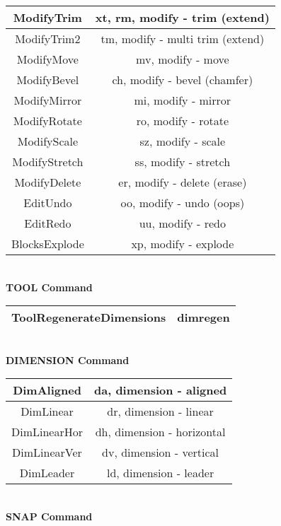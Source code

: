 \begin{table}[h!]\centering\begin{tabular}{|c|c|}
\hline ModifyTrim & xt, rm, modify - trim (extend)\\
\hline ModifyTrim2 & tm, modify - multi trim (extend)\\
\hline ModifyMove & mv, modify - move\\
\hline ModifyBevel & ch, modify - bevel (chamfer)\\
\hline ModifyMirror & mi, modify - mirror\\
\hline ModifyRotate & ro, modify - rotate\\
\hline ModifyScale & sz, modify - scale \\
\hline ModifyStretch & ss, modify - stretch\\
\hline ModifyDelete & er, modify - delete (erase)\\
\hline EditUndo & oo, modify - undo (oops)\\
\hline EditRedo & uu, modify - redo\\
\hline BlocksExplode & xp, modify - explode\\
\hline \end{tabular}\end{table} \vspace{.1in}
%
\textbf{\\TOOL Command}
\begin{table}[h!]\centering\begin{tabular}{|c|c|}
\hline ToolRegenerateDimensions & dimregen\\
\hline \end{tabular}\end{table} \vspace{.1in}
%
\textbf{\\DIMENSION Command}
\begin{table}[h!]\centering\begin{tabular}{|c|c|}
\hline DimAligned & da, dimension - aligned\\
\hline DimLinear & dr, dimension - linear\\
\hline DimLinearHor & dh, dimension - horizontal\\
\hline DimLinearVer & dv, dimension - vertical\\
\hline DimLeader & ld, dimension - leader\\
\hline \end{tabular}\end{table} \vspace{.1in}
%
\textbf{\\SNAP Command}
